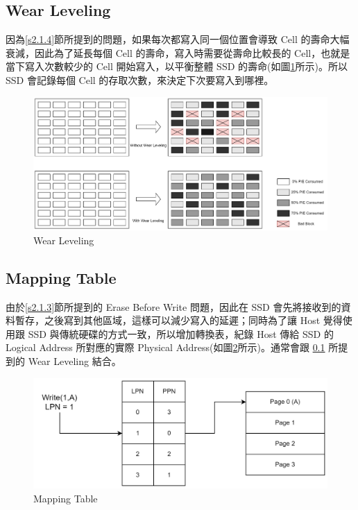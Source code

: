 \subsection{Wear Leveling}\label{s2.2.1}
\indent
因為\ref{s2.1.4}節所提到的問題，如果每次都寫入同一個位置會導致 Cell 的壽命大幅衰減，因此為了延長每個 Cell 的壽命，寫入時需要從壽命比較長的 Cell，也就是當下寫入次數較少的 Cell 開始寫入，以平衡整體 SSD 的壽命(如圖\ref{f2.5}所示)。所以 SSD 會記錄每個 Cell 的存取次數，來決定下次要寫入到哪裡。\cite{Wear_Leveling_Thesis}
\begin{figure}[H]
    \centering
    \includegraphics[width=1\textwidth]{picture/ch2/Wear_Leveling.png}
    \caption{Wear Leveling\cite{Wear_Leveling_Pic}}
    \label{f2.5}
\end{figure}

\subsection{Mapping Table}\label{s2.2.2}
\indent
由於\ref{s2.1.3}節所提到的 Erase Before Write 問題，因此在 SSD 會先將接收到的資料暫存，之後寫到其他區域，這樣可以減少寫入的延遲；同時為了讓 Host 覺得使用跟 SSD 與傳統硬碟的方式一致，所以增加轉換表，紀錄 Host 傳給 SSD 的 Logical Address 所對應的實際 Physical Address(如圖\ref{f2.6}所示)。通常會跟 \ref{s2.2.1} 所提到的 Wear Leveling 結合。\cite{5496970}
\begin{figure}[H]
    \centering
    \includegraphics[width=1\textwidth]{picture/ch2/mapping_table.png}
    \caption{Mapping Table\cite{Mapping_Table}}
    \label{f2.6}
\end{figure}

